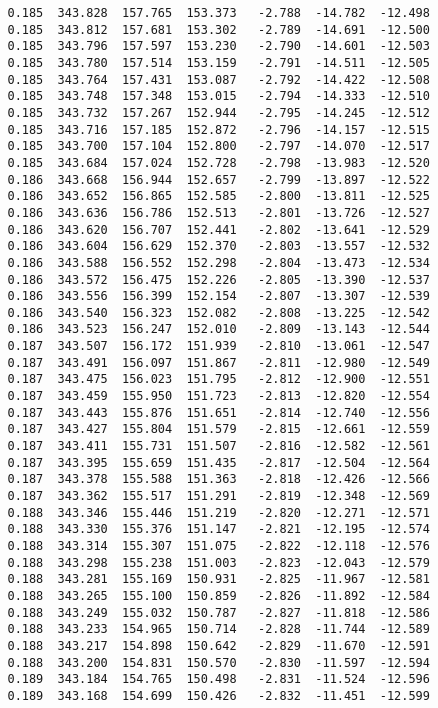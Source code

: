\begin{verbatim}
   0.185  343.828  157.765  153.373   -2.788  -14.782  -12.498
   0.185  343.812  157.681  153.302   -2.789  -14.691  -12.500
   0.185  343.796  157.597  153.230   -2.790  -14.601  -12.503
   0.185  343.780  157.514  153.159   -2.791  -14.511  -12.505
   0.185  343.764  157.431  153.087   -2.792  -14.422  -12.508
   0.185  343.748  157.348  153.015   -2.794  -14.333  -12.510
   0.185  343.732  157.267  152.944   -2.795  -14.245  -12.512
   0.185  343.716  157.185  152.872   -2.796  -14.157  -12.515
   0.185  343.700  157.104  152.800   -2.797  -14.070  -12.517
   0.185  343.684  157.024  152.728   -2.798  -13.983  -12.520
   0.186  343.668  156.944  152.657   -2.799  -13.897  -12.522
   0.186  343.652  156.865  152.585   -2.800  -13.811  -12.525
   0.186  343.636  156.786  152.513   -2.801  -13.726  -12.527
   0.186  343.620  156.707  152.441   -2.802  -13.641  -12.529
   0.186  343.604  156.629  152.370   -2.803  -13.557  -12.532
   0.186  343.588  156.552  152.298   -2.804  -13.473  -12.534
   0.186  343.572  156.475  152.226   -2.805  -13.390  -12.537
   0.186  343.556  156.399  152.154   -2.807  -13.307  -12.539
   0.186  343.540  156.323  152.082   -2.808  -13.225  -12.542
   0.186  343.523  156.247  152.010   -2.809  -13.143  -12.544
   0.187  343.507  156.172  151.939   -2.810  -13.061  -12.547
   0.187  343.491  156.097  151.867   -2.811  -12.980  -12.549
   0.187  343.475  156.023  151.795   -2.812  -12.900  -12.551
   0.187  343.459  155.950  151.723   -2.813  -12.820  -12.554
   0.187  343.443  155.876  151.651   -2.814  -12.740  -12.556
   0.187  343.427  155.804  151.579   -2.815  -12.661  -12.559
   0.187  343.411  155.731  151.507   -2.816  -12.582  -12.561
   0.187  343.395  155.659  151.435   -2.817  -12.504  -12.564
   0.187  343.378  155.588  151.363   -2.818  -12.426  -12.566
   0.187  343.362  155.517  151.291   -2.819  -12.348  -12.569
   0.188  343.346  155.446  151.219   -2.820  -12.271  -12.571
   0.188  343.330  155.376  151.147   -2.821  -12.195  -12.574
   0.188  343.314  155.307  151.075   -2.822  -12.118  -12.576
   0.188  343.298  155.238  151.003   -2.823  -12.043  -12.579
   0.188  343.281  155.169  150.931   -2.825  -11.967  -12.581
   0.188  343.265  155.100  150.859   -2.826  -11.892  -12.584
   0.188  343.249  155.032  150.787   -2.827  -11.818  -12.586
   0.188  343.233  154.965  150.714   -2.828  -11.744  -12.589
   0.188  343.217  154.898  150.642   -2.829  -11.670  -12.591
   0.188  343.200  154.831  150.570   -2.830  -11.597  -12.594
   0.189  343.184  154.765  150.498   -2.831  -11.524  -12.596
   0.189  343.168  154.699  150.426   -2.832  -11.451  -12.599

\end{verbatim}
